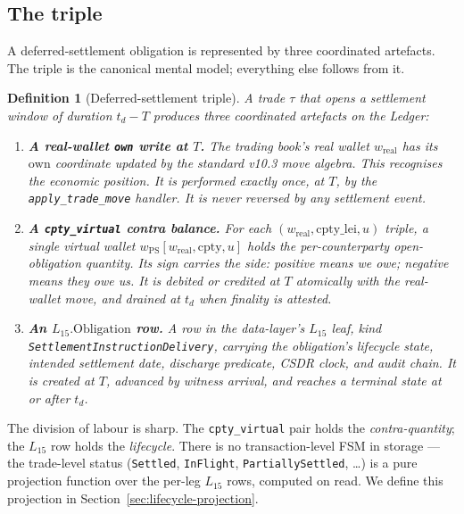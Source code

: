 \documentclass[11pt,a4paper]{article}
\newtheorem{definition}{Definition}[section]
\begin{document}
\subsection{The triple}

A deferred-settlement obligation is represented by three coordinated artefacts. The triple is the canonical mental model; everything else follows from it.

\begin{definition}[Deferred-settlement triple]
\label{def:triple}
A trade $\tau$ that opens a settlement window of duration $t_d - T$ produces three coordinated artefacts on the Ledger:
\begin{enumerate}[nosep]
\item \textbf{A real-wallet \texttt{own} write at $T$.} The trading book's real wallet $w_{\mathrm{real}}$ has its $\mathrm{own}$ coordinate updated by the standard v10.3 move algebra. This recognises the economic position. It is performed exactly once, at $T$, by the \texttt{apply\_trade\_move} handler. It is \emph{never} reversed by any settlement event.
\item \textbf{A \texttt{cpty\_virtual} contra balance.} For each $(w_{\mathrm{real}}, \text{cpty\_lei}, u)$ triple, a single virtual wallet $w_{\mathrm{PS}}[w_{\mathrm{real}}, \text{cpty}, u]$ holds the per-counterparty open-obligation quantity. Its sign carries the side: positive means we owe; negative means they owe us. It is debited or credited at $T$ atomically with the real-wallet move, and drained at $t_d$ when finality is attested.
\item \textbf{An $L_{15}.\mathrm{Obligation}$ row.} A row in the data-layer's $L_{15}$ leaf, kind \texttt{SettlementInstructionDelivery}, carrying the obligation's lifecycle state, intended settlement date, discharge predicate, CSDR clock, and audit chain. It is created at $T$, advanced by witness arrival, and reaches a terminal state at or after $t_d$.
\end{enumerate}
\end{definition}

The division of labour is sharp. The \texttt{cpty\_virtual} pair holds the \emph{contra-quantity}; the $L_{15}$ row holds the \emph{lifecycle}. There is no transaction-level FSM in storage --- the trade-level status (\texttt{Settled}, \texttt{InFlight}, \texttt{PartiallySettled}, \ldots) is a pure projection function over the per-leg $L_{15}$ rows, computed on read. We define this projection in Section~\ref{sec:lifecycle-projection}.
\end{document}
